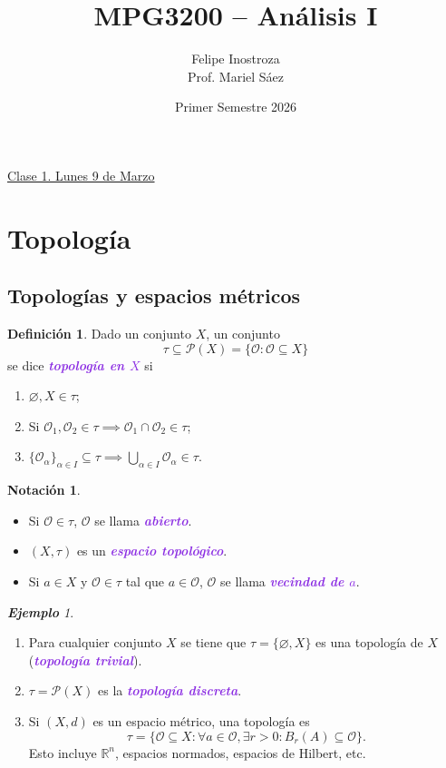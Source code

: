 \documentclass{article}
\title{MPG3200 -- Análisis I}
\author{Felipe Inostroza \\ Prof. Mariel Sáez}
\date{Primer Semestre 2026}
\theoremstyle{definition}
\newtheorem{definition}[theorem]{Definición}
\newtheorem*{notation}{Notación}
\theoremstyle{remark}
\newtheorem{example}[theorem]{\textbf{Ejemplo}}
\numberwithin{equation}{section}
\renewcommand{\O}{\mathcal{O}}
\renewcommand{\P}{\mathcal{P}}
\newcommand{\R}{\mathbb{R}}
\renewcommand{\a}{\alpha}
\renewcommand{\t}{\tau}
\newcommand{\wea}[1]{\textcolor{BlueViolet}{\textbf{\emph{#1}}}}
\newcommand{\fecha}[1]{\begin{flushright} \underline{#1} \end{flushright}}
\begin{document}
\maketitle
\tableofcontents

\newpage
\fecha{Clase 1. Lunes 9 de Marzo}
\section{Topología}
\subsection{Topologías y espacios métricos}

\begin{definition}
  Dado un conjunto $X$, un conjunto
  \[\tau \subseteq \P(X) = \{\O \colon \O \subseteq X\}\]
  se dice \wea{topología en $X$} si
  \begin{enumerate}[(1)]
    \item $\varnothing, X \in \tau$;
    \item Si $\O_1, \O_2 \in \tau \implies \O_1 \cap \O_2 \in \tau$;
    \item $\{\O_\a\}_{\a\in I} \subseteq \tau \implies \bigcup_{\a \in I} \O_\a \in \tau$.
  \end{enumerate}
\end{definition}

\begin{notation}\
  \begin{itemize}
    \item Si $\O \in \t$, $\O$ se llama \wea{abierto}.
    \item $(X,\tau)$ es un \wea{espacio topológico}.
    \item Si $a \in X$ y $\O \in \t$ tal que $a \in \O$, $\O$ se llama \wea{vecindad de $a$}.
  \end{itemize}
\end{notation}

\begin{example}\
  \begin{enumerate}[(1)]
    \item Para cualquier conjunto $X$ se tiene que $\t = \{\varnothing,X\}$ es una topología de $X$ (\wea{topología trivial}).
    \item $\t = \P(X)$ es la \wea{topología discreta}.
    \item Si $(X,d)$ es un espacio métrico, una topología es
    \[\t = \{\O \subseteq X \colon \forall a \in \O, \exists r > 0 \colon B_r(A) \subseteq \O\}.\]
    Esto incluye $\R^n$, espacios normados, espacios de Hilbert, etc.
  \end{enumerate}
\end{example}
\end{document}
